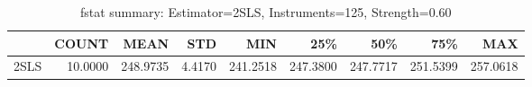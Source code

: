 \begin{table}[ht]
\centering
\caption{fstat summary: Estimator=2SLS, Instruments=125, Strength=0.60}
\begin{tabular}{lrrrrrrrr}
\toprule
 & COUNT & MEAN & STD & MIN & 25\% & 50\% & 75\% & MAX \\
\midrule
2SLS & 10.0000 & 248.9735 & 4.4170 & 241.2518 & 247.3800 & 247.7717 & 251.5399 & 257.0618 \\
\bottomrule
\end{tabular}
\end{table}

